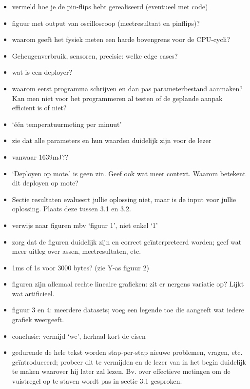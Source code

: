 \documentclass[11pt]{article}
\begin{document}
\begin{itemize}
\item vermeld hoe je de pin-flips hebt gerealiseerd (eventueel met code)
\item figuur met output van oscilloscoop (meetresultaat en pinflips)?
\item waarom geeft het fysiek meten een harde bovengrens voor de CPU-cycli?
\item Geheugenverbruik, sensoren, precisie: welke edge cases?
\item wat is een deployer?
\item waarom eerst programma schrijven en dan pas parameterbestand aanmaken? Kan men niet voor het programmeren al testen of de geplande aanpak efficient is of niet?
\item ‘één temperatuurmeting per minuut’
\item zie dat alle parameters en hun waarden duidelijk zijn voor de lezer
\item vanwaar 1639mJ??
\item ‘Deployen op mote.’ is geen zin. Geef ook wat meer context. Waarom betekent dit deployen op mote?
\item Sectie resultaten evalueert jullie oplossing niet, maar is de input voor jullie oplossing. Plaats deze tussen 3.1 en 3.2.
\item verwijs naar figuren mbv ‘figuur 1’, niet enkel ‘1’
\item zorg dat de figuren duidelijk zijn en correct geïnterpreteerd worden; geef wat meer uitleg over assen, meetresultaten, etc.
\item 1ms of 1s voor 3000 bytes? (zie Y-as figuur 2)
\item figuren zijn allemaal rechte lineaire grafieken: zit er nergens variatie op? Lijkt wat artificieel.
\item figuur 3 en 4: meerdere datasets; voeg een legende toe die aangeeft wat iedere grafiek weergeeft.
\item conclusie: vermijd ‘we’, herhaal kort de eisen

\item gedurende de hele tekst worden stap-per-stap nieuwe problemen, vragen, etc. geïntroduceerd; probeer dit te vermijden en de lezer van in het begin duidelijk te maken waarover hij later zal lezen. Bv. over effectieve metingen om de vuistregel op te staven wordt pas in sectie 3.1 gesproken.
\end{itemize}
\end{document}
